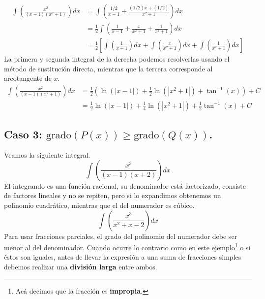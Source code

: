 \documentclass[12pt]{article}
\begin{document}
\begin{align*}
\int \left(\frac{x^{2}}{(x - 1)(x^{2} + 1)}\right) dx &= \int \left(\frac{1/2}{x - 1} + \frac{(1/2)x + (1/2)}{x^{2} + 1}\right) dx \\
                                                      &= \frac{1}{2} \int \left(
                                                                            \frac{1}{x - 1} + \frac{x}{x^{2} + 1} + \frac{1}{x^{2} + 1}
                                                                          \right) dx \\
                                                      &= \frac{1}{2} \left[
                                                            \int \left(\frac{1}{x - 1}\right) dx +
                                                            \int \left(\frac{x}{x^{2} + 1}\right) dx +
                                                            \int \left(\frac{1}{x^{2} + 1}\right) dx
                                                          \right]
\end{align*}
La primera y segunda integral de la derecha podemos resolverlas usando el método de sustitución directa, mientras que la tercera corresponde al arcotangente de $x$.
\begin{align*}
  \int \left(\frac{x^{2}}{(x - 1)(x^{2} + 1)}\right) dx &= \frac{1}{2} \left(\ln(|x - 1|) + \frac{1}{2} \ln(|x^{2} + 1|) + \tan^{-1}(x)\right) + C \\
                                                        &= \frac{1}{2} \ln(|x - 1|) + \frac{1}{4} \ln(|x^{2} + 1|) + \frac{1}{2} \tan^{-1}(x) + C
\end{align*}

\subsection{Caso 3: \texorpdfstring{$\text{grado}(P(x)) \geq \text{grado}(Q(x))$}{Grado del numerador es mayor o igual al grado del denominador}.}

Veamos la siguiente integral.
\[
  \int \left(\frac{x^{3}}{(x - 1)(x + 2)}\right) dx
\]
El integrando es una función racional, su denominador está factorizado, consiste de factores lineales y no se repiten, pero si lo expandimos obtenemos un polinomio cuadrático, mientras que el del numerador es cúbico.
\[
  \int \left(\frac{x^{3}}{x^{2} + x - 2}\right) dx
\]
Para usar fracciones parciales, el grado del polinomio del numerador debe ser menor al del denominador. Cuando ocurre lo contrario como en este ejemplo\footnote{Acá decimos que la fracción es \textbf{impropia}.} o si éstos son iguales, antes de llevar la expresión a una suma de fracciones simples debemos realizar una \textbf{división larga} entre ambos.
\end{document}
